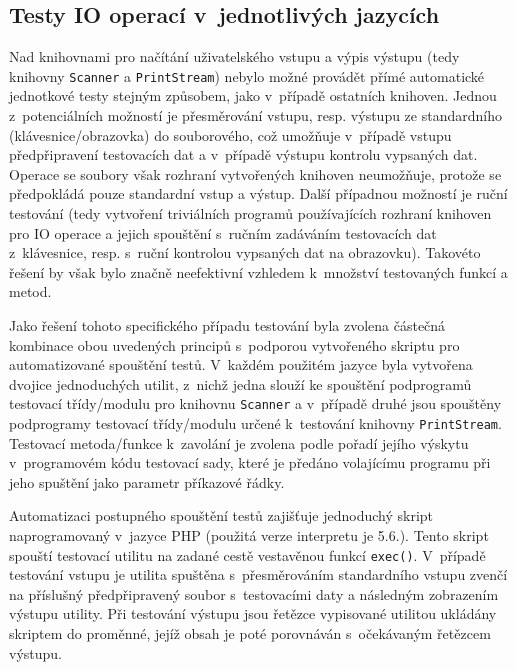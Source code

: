 \documentclass[czech,BP]{thesiskiv}
\begin{document}
\subsection{Testy IO operací v~jednotlivých jazycích}
Nad knihovnami pro načítání uživatelského vstupu a výpis výstupu (tedy knihovny \texttt{Scanner} a \texttt{PrintStream}) nebylo možné provádět přímé automatické jednotkové testy stejným způsobem, jako v~případě ostatních knihoven. Jednou z~potenciálních možností je přesměrování vstupu, resp. výstupu ze standardního (klávesnice/obrazovka) do souborového, což umožňuje v~případě vstupu předpřipravení testovacích dat a v~případě výstupu kontrolu vypsaných dat. Operace se soubory však rozhraní vytvořených knihoven neumožňuje, protože se předpokládá pouze standardní vstup a výstup. Další případnou možností je ruční testování (tedy vytvoření triviálních programů používajících rozhraní knihoven pro IO operace a jejich spouštění s~ručním zadáváním testovacích dat z~klávesnice, resp. s~ruční kontrolou vypsaných dat na obrazovku). Takovéto řešení by však bylo značně neefektivní vzhledem k~množství testovaných funkcí a metod.\par
Jako řešení tohoto specifického případu testování byla zvolena částečná kombinace obou uvedených principů s~podporou vytvořeného skriptu pro automatizované spouštění testů. V~každém použitém jazyce byla vytvořena dvojice jednoduchých utilit, z~nichž jedna slouží ke spouštění podprogramů testovací třídy/modulu pro knihovnu \texttt{Scanner} a v~případě druhé jsou spouštěny podprogramy testovací třídy/modulu určené k~testování knihovny \texttt{PrintStream}. Testovací metoda/funkce k~zavolání je zvolena podle pořadí jejího výskytu v~programovém kódu testovací sady, které je předáno volajícímu programu při jeho spuštění jako parametr příkazové řádky.\par
Automatizaci postupného spouštění testů zajišťuje jednoduchý skript naprogramovaný v~jazyce PHP (použitá verze interpretu je 5.6.). Tento skript spouští testovací utilitu na zadané cestě vestavěnou funkcí \texttt{exec()}. V~případě testování vstupu je utilita spuštěna s~přesměrováním standardního vstupu zvenčí na příslušný předpřipravený soubor s~testovacími daty a následným zobrazením výstupu utility. Při testování výstupu jsou řetězce vypisované utilitou ukládány skriptem do proměnné, jejíž obsah je poté porovnáván s~očekávaným řetězcem výstupu.
\end{document}
